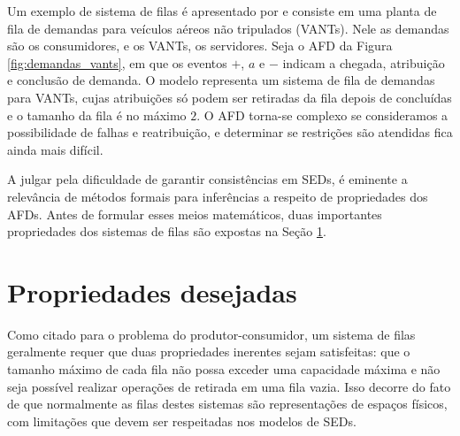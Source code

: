 Um exemplo de sistema de filas é apresentado por  e consiste em uma planta de fila de demandas para veículos aéreos não tripulados (\acs{VANT}s). Nele as demandas são os consumidores, e os VANTs, os servidores. Seja o AFD da Figura \ref{fig:demandas_vants}, em que os eventos $+$, $a$ e $-$ indicam a chegada, atribuição e conclusão de demanda. O modelo representa um sistema de fila de demandas para VANTs, cujas atribuições só podem ser retiradas da fila depois de concluídas e o tamanho da fila é no máximo $2$. O AFD torna-se complexo se consideramos a possibilidade de falhas e reatribuição, e determinar se restrições são atendidas fica ainda mais difícil.


A julgar pela dificuldade de garantir consistências em SEDs, é eminente a relevância de métodos formais para inferências a respeito de propriedades dos AFDs. Antes de formular esses meios matemáticos, duas importantes propriedades dos sistemas de filas são expostas na Seção \ref{sec:props}.

\section{Propriedades desejadas}
\label{sec:props}

Como citado para o problema do produtor-consumidor, um sistema de filas geralmente requer que duas propriedades inerentes sejam satisfeitas: que o tamanho máximo de cada fila não possa exceder uma capacidade máxima e não seja possível realizar operações de retirada em uma fila vazia. Isso decorre do fato de que normalmente as filas destes sistemas são representações de espaços físicos, com limitações que devem ser respeitadas nos modelos de SEDs.

